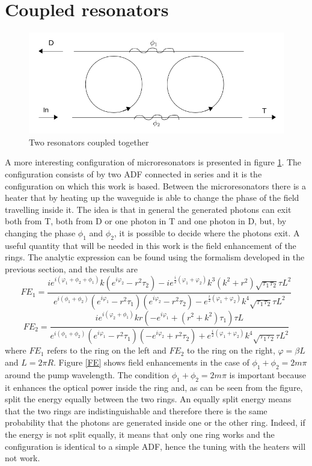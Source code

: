 \section{Coupled resonators}\label{coupled}
\begin{figure}[H]
\centering
\includegraphics[width = .7\textwidth]{img/coupled}
\caption{Two resonators coupled together}
\label{resonatorcoupled}
\end{figure}
A more interesting configuration of microresonators is presented in figure \ref{resonatorcoupled}. The configuration consists of by two ADF connected in series and it is the configuration on which this work is based. Between the microresonators there is a heater that by heating up the waveguide is able to change the phase of the field travelling inside it. The idea is that in general the generated photons can exit both from T, both from D or one photon in T and one photon in D, but, by changing the phase $\phi_1$ and $\phi_2$, it is possible to decide where the photons exit. A useful quantity that will be needed in this work is the field enhancement of the rings. The analytic expression can be found using the formalism developed in the previous section, and the results are
\[FE_1 = \frac{ie^{i(\varphi_1+\phi_2+\phi_1)}k (e^{i\varphi_2}-r^2\tau_2)-ie^{\frac{i}{2}(\varphi_1+\varphi_2)}k^3(k^2+r^2)\sqrt{\tau_1\tau_2}\tau L^2}{e^{i(\phi_1+\phi_2)}(e^{i\varphi_1}-r^2\tau_1)(e^{i\varphi_2}-r^2\tau_2)-e^{\frac{i}{2}(\varphi_1+\varphi_2)}k^4\sqrt{\tau_1\tau_2}\tau L^2}\]
\[FE_2 = \frac{ie^{i(\varphi_2+\phi_1)}kr (-e^{i\varphi_1}+(r^2+k^2)\tau_1)\tau L}{e^{i(\phi_1+\phi_2)}(e^{i\varphi_1}-r^2\tau_1)(-e^{i\varphi_2}+r^2\tau_2)+e^{\frac{i}{2}(\varphi_1+\varphi_2)}k^4\sqrt{\tau_1\tau_2}\tau L^2}\]
where $FE_1$ refers to the ring on the left and $FE_2$ to the ring on the right, $\varphi = \beta L$ and $L=2\pi R$. Figure \ref{FE} shows field enhancements in the case of $\phi_1 + \phi_2 = 2m\pi$ around the pump wavelength. The condition $\phi_1 + \phi_2 = 2m\pi$ is important because it enhances the optical power inside the ring and, as can be seen from the figure, split the energy equally between the two rings. An equally split energy means that the two rings are indistinguishable and therefore there is the same probability that the photons are generated inside one or the other ring. Indeed, if the energy is not split equally, it means that only one ring works and the configuration is identical to a simple ADF, hence the tuning with the heaters will not work. 


